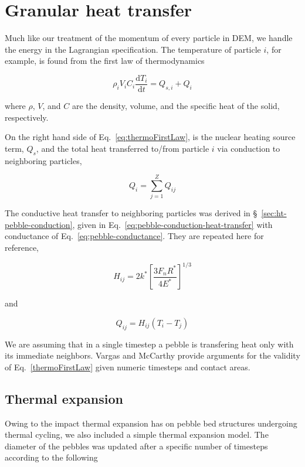 \section{Granular heat transfer}\label{sec:dem-heat-transfer}

Much like our treatment of the momentum of every particle in DEM, we handle the energy in the Lagrangian specification. The temperature of particle $i$, for example, is found from the first law of thermodynamics

\begin{equation}\label{eq:thermoFirstLaw}
	\rho_iV_iC_i\frac{\mathrm{d}T_i}{\mathrm{d}t} = Q_{s,i} + Q_{i}
\end{equation}

where $\rho$, $V$, and $C$ are the density, volume, and the specific heat of the solid, respectively. 

On the right hand side of Eq.~\ref{eq:thermoFirstLaw}, is the nuclear heating source term, $Q_{s}$, and the total heat transferred to/from particle $i$ via conduction to neighboring particles,

\begin{equation}
	Q_i = \sum_{j=1}^Z Q_{ij}
\end{equation}

The conductive heat transfer to neighboring particles was derived in \S~\ref{sec:ht-pebble-conduction}, given in Eq.~\ref{eq:pebble-conduction-heat-transfer} with conductance of Eq.~\ref{eq:pebble-conductance}. They are repeated here for reference,

\begin{equation*}
	H_{ij}= 2k^*\left[\frac{3F_nR^*}{4E^*}\right]^{1/3}
\end{equation*}

and

\begin{equation*}
	Q_{ij} = H_{ij}(T_i - T_j)
\end{equation*} 

We are assuming that in a single timestep a pebble is transfering heat only with its immediate neighbors. Vargas and McCarthy\cite{Vargas2001} provide arguments for the validity of Eq.~\ref{thermoFirstLaw} given numeric timesteps and contact areas.


\subsection{Thermal expansion}
Owing to the impact thermal expansion has on pebble bed structures undergoing thermal cycling\cite{Tanigawa:2010cr, Vargas2007, Chen2009}, we also included a simple thermal expansion model.  The diameter of the pebbles was updated after a specific number of timesteps according to the following

